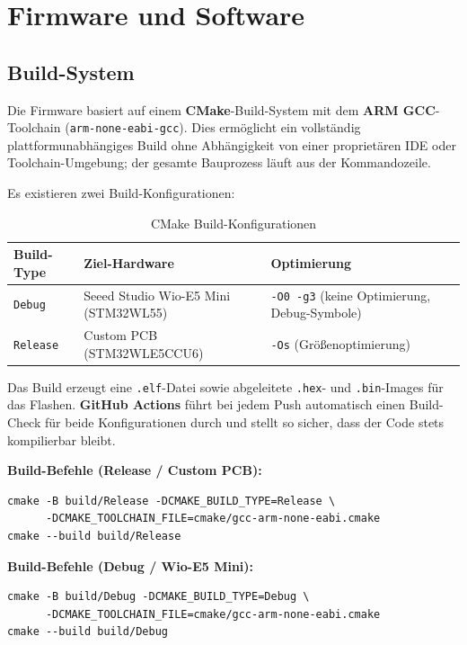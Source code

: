 \chapter{Firmware und Software}
\label{cha:software}

\section*{Build-System}

Die Firmware basiert auf einem \textbf{CMake}-Build-System mit dem \textbf{ARM GCC}-Toolchain (\texttt{arm-none-eabi-gcc}). Dies ermöglicht ein vollständig plattformunabhängiges Build ohne Abhängigkeit von einer proprietären IDE oder Toolchain-Umgebung; der gesamte Bauprozess läuft aus der Kommandozeile.

Es existieren zwei Build-Konfigurationen:

\begin{table}[H]
  \centering
  \begin{tabular}{lll}
    \hline
    \textbf{Build-Type} & \textbf{Ziel-Hardware} & \textbf{Optimierung} \\
    \hline
    \texttt{Debug}   & Seeed Studio Wio-E5 Mini (STM32WL55) & \texttt{-O0 -g3} (keine Optimierung, Debug-Symbole) \\
    \texttt{Release} & Custom PCB (STM32WLE5CCU6) & \texttt{-Os} (Größenoptimierung) \\
    \hline
  \end{tabular}
  \caption{CMake Build-Konfigurationen}
  \label{tab:build}
\end{table}

Das Build erzeugt eine \texttt{.elf}-Datei sowie abgeleitete \texttt{.hex}- und \texttt{.bin}-Images für das Flashen. \textbf{GitHub Actions} führt bei jedem Push automatisch einen Build-Check für beide Konfigurationen durch und stellt so sicher, dass der Code stets kompilierbar bleibt.

\textbf{Build-Befehle (Release / Custom PCB):}
\begin{verbatim}
cmake -B build/Release -DCMAKE_BUILD_TYPE=Release \
      -DCMAKE_TOOLCHAIN_FILE=cmake/gcc-arm-none-eabi.cmake
cmake --build build/Release
\end{verbatim}

\textbf{Build-Befehle (Debug / Wio-E5 Mini):}
\begin{verbatim}
cmake -B build/Debug -DCMAKE_BUILD_TYPE=Debug \
      -DCMAKE_TOOLCHAIN_FILE=cmake/gcc-arm-none-eabi.cmake
cmake --build build/Debug
\end{verbatim}

